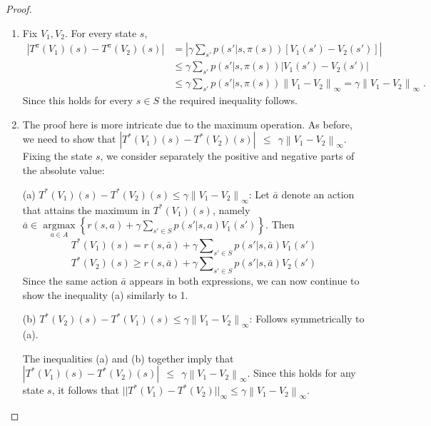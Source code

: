 \begin{proof}
\begin{enumerate}
  \item Fix ${V_1},{V_2}$. For every state $s$,
\begin{align*}
\left| {T_{}^\pi ({V_1})(s) - T_{}^\pi ({V_2})(s)} \right| &= \left| {\gamma \sum\nolimits_{s'} {p(s'|s,\pi (s))[{V_1}(s') - {V_2}(s')]} } \right|\\
 &\le \gamma \sum\nolimits_{s'} {p(s'|s,\pi (s))\left| {{V_1}(s') - {V_2}(s')} \right|} \\
 &\le \gamma \sum\nolimits_{s'} {p(s'|s,\pi (s))} {\left\| {{V_1} - {V_2}} \right\|_\infty } = \gamma {\left\| {{V_1} - {V_2}} \right\|_\infty }\;.
\end{align*}
Since this holds for every $s \in S$ the required inequality follows.
  \item The proof here is more intricate due to the maximum operation. As before, we need to show that  $|T_{}^*({V_1})(s) - T_{}^*({V_2})(s)|\;\, \le \;\,\gamma {\left\| {{V_1} - {V_2}} \right\|_\infty }$. Fixing the state $s$, we consider separately the positive and negative parts of the absolute value:

(a) $T_{}^*({V_1})(s) - T_{}^*({V_2})(s) \le \gamma {\left\| {{V_1} - {V_2}} \right\|_\infty }$:   Let $\bar a$ denote an action that attains the maximum in $T_{}^*({V_1})(s)$, namely $\bar a \in \mathop {\arg \max }\limits_{a \in A} \left\{ {r(s,a) + \gamma \sum\nolimits_{s' \in S} {p(s'|s,a){V_1}(s')} } \right\}$. Then
\[T_{}^*({V_1})(s) = r(s,\bar a) + \gamma \sum\nolimits_{s' \in S} {p(s'|s,\bar a){V_1}(s')} \]
\[T_{}^*({V_2})(s) \ge r(s,\bar a) + \gamma \sum\nolimits_{s' \in S} {p(s'|s,\bar a){V_2}(s')} \]
Since the same action $\bar a$ appears in both expressions, we can now continue to show the inequality (a) similarly to 1.

(b) $T_{}^*({V_2})(s) - T_{}^*({V_1})(s) \le \gamma {\left\| {{V_1} - {V_2}} \right\|_\infty }$:   Follows symmetrically to (a).

The inequalities (a) and (b) together imply that $|T_{}^*({V_1})(s) - T_{}^*({V_2})(s)|\;\, \le \;\,\gamma {\left\| {{V_1} - {V_2}} \right\|_\infty }$. Since this holds for any state $s$, it follows that $||T_{}^*({V_1}) - T_{}^*({V_2})|{|_\infty } \le \gamma {\left\| {{V_1} - {V_2}} \right\|_\infty }$.
\end{enumerate}
\end{proof}


